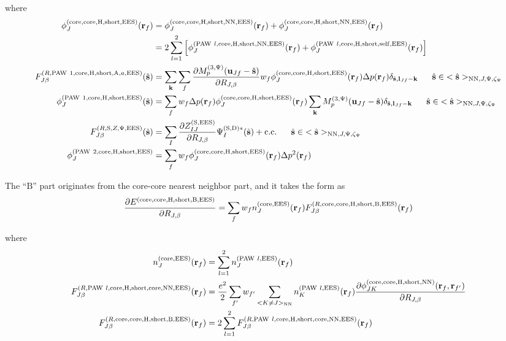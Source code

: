 \documentclass[paper=a4, fontsize=11pt]{article} %
\numberwithin{equation}{section} %
\numberwithin{figure}{section} %
\numberwithin{table}{section} %
\newcommand{\p}{\partial}
\newcommand{\bu}{{\bf{u}}}
\newcommand{\bl}{{\bf{l}}}
\newcommand{\bk}{{\bf{k}}}
\newcommand{\bs}{{\bf{s}}}
\newcommand{\br}{{\bf{r}}}
\newcommand{\hs}{{\hat{\bf{s}}}}
\newcommand{\rS}{{\mathrm{S}}}
\newcommand{\rEES}{{\mathrm{EES}}}
\newcommand{\rcore}{{\mathrm{core}}}
\newcommand{\rNN}{{\mathrm{NN}}}
\newcommand{\rself}{{\mathrm{self}}}
\newcommand{\rshort}{{\mathrm{short}}}
\newcommand{\rcc}{{\mathrm{c.c.}}}
\newcommand{\rP}{{\mathrm{PAW}}}
\newcommand{\rH}{{\mathrm{H}}}
\newcommand{\rA}{{\mathrm{A}}}
\newcommand{\rB}{{\mathrm{B}}}
\newcommand{\rD}{{\mathrm{D}}}
\newcommand{\RJb}{{R_{J,\beta}}}
\newcommand{\Mp}{{M_p^{(3,\Psi)}}}
\newcommand{\hsJp}{{<\hs>_{\rNN,J,\Psi,\zeta_\Psi}}}
\newcommand{\hsinJp}{{\ \ \ \ \ \hs  \in  \hsJp}}
\begin{document}
where
\begin{equation}
\begin{split}
\phi_J^{(\rcore,\rcore,\rH,\rshort,\rEES)}(\br_f) &=\phi_J^{(\rcore,\rcore,\rH,\rshort,\rNN,\rEES)}(\br_f)+\phi_J^{(\rcore,\rcore,\rH,\rshort,\rNN,\rEES)}(\br_f)\\
&= 2\sum_{l=1}^2\left[\phi_J^{(\rP\ l,\rcore,\rH,\rshort,\rNN,\rEES)}(\br_f) + \phi_J^{(\rP\ l,\rcore,\rH,\rshort,\rself,\rEES)}(\br_f) \right]\\
F_{J\beta}^{(R,\rP\ 1,\rcore,\rH,\rshort,\rA,a,\rEES)}(\hs)
&=\sum_{\bk}\sum_f  \frac{\p \Mp(\bu_{Jf}-\hat \bs)}{\p \RJb}w_f \phi_J^{(\rcore,\rcore,\rH,\rshort,\rEES)}(\br_f)  \Delta p(\br_f)\delta_{\hat \bs,\bl_{Jf}-\bk} \hsinJp \\
\phi_J^{(\rP\ 1,\rcore,\rH,\rshort,\rEES)}(\hs) &= \sum_f w_f \Delta p(\br_f) \phi_J^{(\rcore,\rcore,\rH,\rshort,\rEES)}(\br_f)  \sum_{\bk} \Mp(\bu_{Jf}-\hat \bs)\delta_{\hat \bs,\bl_{Jf}-\bk} \hsinJp \\
F_{J\beta}^{(R,\rS,Z,\Psi,\rEES)}(\hs) &= \sum_I \frac{\p Z_{IJ}^{(\rS,\rEES)}}{\p \RJb}\Psi_I^{(\rS,\rD)*}(\hat \bs) + \rcc \hsinJp \\
\phi_J^{(\rP\ 2,\rcore,\rH,\rshort,\rEES)} &= \sum_f w_f \phi_J^{(\rcore,\rcore,\rH,\rshort,\rEES)}(\br_f) \Delta p^2(\br_f) \\
\end{split}
\end{equation}


The ``$\rB$'' part originates from the core-core nearest neighbor part, and it takes the form as
\begin{equation}
\begin{split}
\frac{\p E^{(\rcore,\rcore,\rH,\rshort,\rB,\rEES)}}{\p \RJb} &=
\sum_{f} w_f n_{J}^{(\rcore,\rEES)}(\br_f) F_{J\beta}^{(R,\rcore,\rcore,\rH,\rshort,\rB,\rEES)}(\br_f)\\
\end{split}
\end{equation}

where
\begin{equation}
\begin{split}
n_{J}^{(\rcore,\rEES)}(\br_f)&= \sum_{l=1}^2 n_{J}^{(\rP\ l,\rEES)}(\br_f)\\
F_{J\beta}^{(R,\rP\ l,\rcore,\rH,\rshort,\rcore,\rNN,\rEES)}(\br_f)&=\frac{e^2}{2}\sum_{f'}w_{f'}\sum_{<K \neq J>_\rNN}n_{K}^{(\rP\ l,\rEES)}(\br_f) \frac{\p \phi_{JK}^{(\rcore,\rcore,\rH,\rshort,\rNN)}(\br_f,\br_{f'})}{\p \RJb}\\
F_{J\beta}^{(R,\rcore,\rcore,\rH,\rshort,\rB,\rEES)}(\br_f)&= 2\sum_{l=1}^2F_{J\beta}^{(R,\rP\ l,\rcore,\rH,\rshort,\rcore,\rNN,\rEES)}(\br_f)\\
\end{split}
\end{equation}
\end{document}
